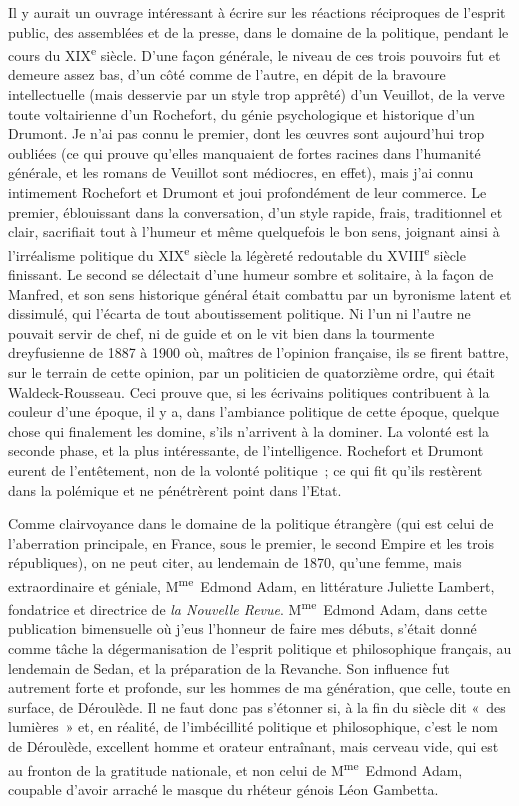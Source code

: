 \documentclass[french,twoside]{book} %
\begin{document}
Il y aurait un ouvrage intéressant à écrire sur les réactions réciproques de l’esprit public, des assemblées et de la presse, dans le domaine de la politique, pendant le cours du XIX\textsuperscript{e} siècle. D’une façon générale, le niveau de ces trois pouvoirs fut et demeure assez bas, d’un côté comme de l’autre, en dépit de la bravoure intellectuelle (mais desservie par un style trop apprêté) d’un Veuillot, de la verve toute voltairienne d’un Rochefort, du génie psychologique et historique d’un Drumont. Je n’ai pas connu le premier, dont les œuvres sont aujourd’hui trop oubliées (ce qui prouve qu’elles manquaient de fortes racines dans l’humanité générale, et les romans de Veuillot sont médiocres, en effet), mais j’ai connu intimement Rochefort et Drumont et joui profondément de leur commerce. Le premier, éblouissant dans la conversation, d’un style rapide, frais, traditionnel et clair, sacrifiait tout à l’humeur et même quelquefois le bon sens, joignant ainsi à l’irréalisme politique du XIX\textsuperscript{e} siècle la légèreté redoutable du XVIII\textsuperscript{e} siècle finissant. Le second se délectait d’une humeur sombre et solitaire, à la façon de Manfred, et son sens historique général était combattu par un byronisme latent et dissimulé, qui l’écarta de tout aboutissement politique. Ni l’un ni l’autre ne pouvait servir de chef, ni de guide et on le vit bien dans la tourmente dreyfusienne de 1887 à 1900 où, maîtres de l’opinion française, ils se firent battre, sur le terrain de cette opinion, par un politicien de quatorzième ordre, qui était Waldeck-Rousseau. Ceci prouve que, si les écrivains politiques contribuent à la couleur d’une époque, il y a, dans l’ambiance politique de cette époque, quelque chose qui finalement les domine, s’ils n’arrivent à la dominer. La volonté est la seconde phase, et la plus intéressante, de l’intelligence. Rochefort et Drumont eurent de l’entêtement, non de la volonté politique ; ce qui fit qu’ils restèrent dans la polémique et ne pénétrèrent point dans l’Etat.\par
Comme clairvoyance dans le domaine de la politique étrangère (qui est celui de l’aberration principale, en France, sous le premier, le second Empire et les trois républiques), on ne peut citer, au lendemain de 1870, qu’une femme, mais extraordinaire et géniale, M\textsuperscript{me} Edmond Adam, en littérature Juliette Lambert, fondatrice et directrice de {\itshape la Nouvelle Revue}. M\textsuperscript{me} Edmond Adam, dans cette publication bimensuelle où j’eus l’honneur de faire mes débuts, s’était donné comme tâche la dégermanisation de l’esprit politique et philosophique français, au lendemain de Sedan, et la préparation de la Revanche. Son influence fut autrement forte et profonde, sur les hommes de ma génération, que celle, toute en surface, de Déroulède. Il ne faut donc pas s’étonner si, à la fin du siècle dit « des lumières » et, en réalité, de l’imbécillité politique et philosophique, c’est le nom de Déroulède, excellent homme et orateur entraînant, mais cerveau vide, qui est au fronton de la gratitude nationale, et non celui de M\textsuperscript{me} Edmond Adam, coupable d’avoir arraché le masque du rhéteur génois Léon Gambetta.\par
\end{document}
